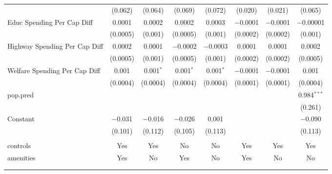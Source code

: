 \begin{table}[!htbp]
\begin{tabular}{@{\extracolsep{5pt}}lccccccc}
  & (0.062) & (0.064) & (0.069) & (0.072) & (0.020) & (0.021) & (0.065) \\ 
  Educ Spending Per Cap Diff & 0.0001 & 0.0002 & 0.0002 & 0.0003 & $-$0.0001 & $-$0.0001 & $-$0.00001 \\ 
  & (0.0005) & (0.001) & (0.0005) & (0.001) & (0.0002) & (0.0002) & (0.001) \\ 
  Highway Spending Per Cap Diff & 0.0002 & 0.0001 & $-$0.0002 & $-$0.0003 & 0.0001 & 0.0001 & 0.0002 \\ 
  & (0.0005) & (0.001) & (0.0005) & (0.001) & (0.0002) & (0.0002) & (0.0005) \\ 
  Welfare Spending Per Cap Diff & 0.001 & 0.001$^{*}$ & 0.001$^{*}$ & 0.001$^{*}$ & $-$0.0001 & $-$0.0001 & 0.001 \\ 
  & (0.0004) & (0.0004) & (0.0004) & (0.0004) & (0.0001) & (0.0001) & (0.0004) \\ 
  pop.pred &  &  &  &  &  &  & 0.984$^{***}$ \\ 
  &  &  &  &  &  &  & (0.261) \\ 
  Constant & $-$0.031 & $-$0.016 & $-$0.026 & 0.001 &  &  & $-$0.090 \\ 
  & (0.101) & (0.112) & (0.105) & (0.113) &  &  & (0.113) \\ 
 \hline \\[-1.8ex] 
controls & Yes & Yes & No & No & Yes & Yes & Yes \\ 
amenities & Yes & No & Yes & No & Yes & No & No \\ 
\hline \\[-1.8ex] 
\hline 
\hline \\[-1.8ex] 
\end{tabular} 
\end{table} 
